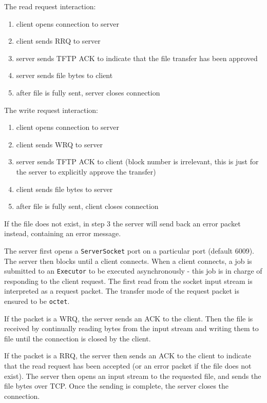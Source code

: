 \documentclass[a4paper]{article}
\newcommand{\code}{\texttt}
\begin{document}
\begin{minipage}[t]{.5\textwidth}
The read request interaction:
\begin{enumerate}
\item client opens connection to server
\item client sends RRQ to server
\item server sends TFTP ACK to indicate that the file transfer has been approved
\item server sends file bytes to client
\item after file is fully sent, server closes connection 
\end{enumerate}
\end{minipage}%
\begin{minipage}[t]{.5\textwidth}
The write request interaction:
\begin{enumerate}
\item client opens connection to server
\item client sends WRQ to server
\item server sends TFTP ACK to client (block number is irrelevant, this is just for the server to explicitly approve the transfer)
\item client sends file bytes to server
\item after file is fully sent, client closes connection
\end{enumerate}
\end{minipage}

If the file does not exist, in step 3 the server will send back an error packet instead, containing an error message.

The server first opens a \code{ServerSocket} port on a particular port (default 6009). The server then blocks until a client connects. When a client connects, a job is submitted to an \code{Executor} to be executed asynchronously - this job is in charge of responding to the client request. The first read from the socket input stream is interpreted as a request packet. The transfer mode of the request packet is ensured to be \code{octet}.

If the packet is a WRQ, the server sends an ACK to the client. Then the file is received by continually reading bytes from the input stream and writing them to file until the connection is closed by the client.

If the packet is a RRQ, the server then sends an ACK to the client to indicate that the read request has been accepted (or an error packet if the file does not exist). The server then opens an input stream to the requested file, and sends the file bytes over TCP. Once the sending is complete, the server closes the connection.
\end{document}
